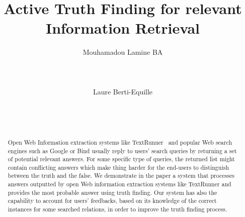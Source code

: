 \documentclass{sig-alternate}
\begin{document}
\conferenceinfo{}{}

\title{Active Truth Finding for relevant Information Retrieval}

\author{
\alignauthor
Mouhamadou Lamine BA\\
       \\
       \\
       \\
\alignauthor
Laure Berti-Equille\\
       \\
       \\
       \\
}


\maketitle

\begin{abstract}
Open Web Information extraction systems like TextRunner~\cite{Yates07}
and popular Web search engines such as Google or Bind usually reply to
users' search queries by returning a set of potential relevant answers.
For some specific type of queries, the returned list might contain conflicting 
answers which make thing harder for the end-users to distinguish between the truth
and the false.
We demonstrate in the paper a system that processes answers outputted 
by open Web information extraction systems like TextRunner and provides 
the most probable answer using truth finding. Our system has also the 
capability to account for users' feedbacks, based on its knowledge of the 
correct instances for some searched relations, in order to improve the truth
finding process.
\end{abstract}

\end{document}
